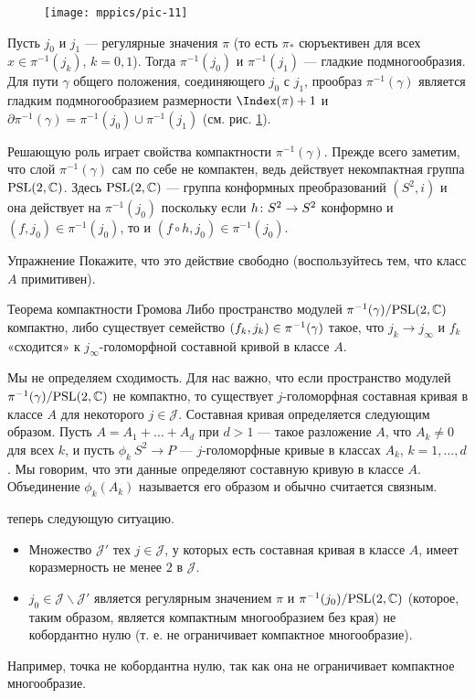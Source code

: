 \begin{figure}[ht!]
\vskip0mm
\centering
\texttt{[image: mppics/pic-11]}
\caption{}\label{pic-11}
\vskip0mm
\end{figure}

Пусть $j_0$ и $j_1$ --- регулярные значения $\pi$ (то есть $\pi_\ast$ сюръективен для всех $x \in \pi^{-1} (j_k)$, $k = 0, 1$).
Тогда $\pi^{-1} (j_0)$ и $\pi^{-1} (j_1)$ --- гладкие подмногообразия.
Для пути $\gamma$ общего положения, соединяющего $j_0$ с $j_1$, прообраз $\pi^{-1}(\gamma)$ является гладким подмногообразием размерности $\Index (\pi) + 1$ и $\partial\pi^{-1} (\gamma) = \pi^{-1} (j_0) \cup \pi^{-1} (j_1)$ (см. рис. \ref{pic-11}).

Решающую роль играет свойства компактности $\pi^{-1} (\gamma)$.
Прежде всего заметим, что слой $\pi^{-1} (\gamma)$ сам по себе не компактен, ведь действует некомпактная группа $\mathrm{PSL}(2, \mathbb{C})$.
Здесь $\mathrm{PSL}(2, \mathbb{C})$ --- группа конформных преобразований $(S^2, i)$ и она действует на $\pi^{-1} (j_0)$ поскольку
если $h\: S^2 \z\to S^2$ конформно и $(f, j_0) \in \pi^{-1} (j_0)$, то и $(f \circ h, j_0) \in \pi^{-1} (j_0)$.

\begin{ex*}{Упражнение}
Покажите, что это действие свободно (воспользуйтесь тем, что класс $A$ примитивен).
\end{ex*}

\begin{thm*}{Теорема компактности Громова}
Либо пространство модулей $\pi^{-1} (\gamma)/\mathrm{PSL}(2, \mathbb{C})$ компактно, либо существует семейство $(f_k, j_k) \z\in \pi^{-1} (\gamma)$ такое, что $j_k \to j_\infty$ и $f_k$ «сходится» к $j_\infty$-голоморфной составной кривой в классе $A$.
\end{thm*}

Мы не определяем сходимость.
Для нас важно, что если пространство модулей $\pi^{-1} (\gamma)/\mathrm{PSL}(2, \mathbb{C})$ не компактно, то существует $j$-голоморфная составная кривая в классе $A$ для некоторого $j \in \mathcal{J}$.
Составная кривая определяется следующим образом.
Пусть $A = A_1 +\dots+ A_d$ при $d > 1$ --- такое разложение $A$, что $A_k \ne 0$ для всех $k$, и пусть $\phi_k \: S^2 \to P$ --- $j$-голоморфные кривые в классах $A_k$, $k = 1,\dots,d$.
Мы говорим, что эти данные определяют составную кривую в классе $A$.
Объединение $\phi_k (A_k)$ называется его образом и обычно считается связным.

 теперь следующую ситуацию.
\begin{itemize}
\item Множество $\mathcal{J}'$ тех $j \in \mathcal{J}$, у которых есть составная кривая в классе $A$, имеет коразмерность не менее $2$ в $\mathcal{J}$.

\item $j_0 \in \mathcal{J}\backslash \mathcal{J}'$ является регулярным значением $\pi$ и $\pi^{-1} (j_0)/\mathrm{PSL}(2, \mathbb{C})$ (которое, таким образом, является компактным многообразием без края) не кобордантно нулю (т. е. не ограничивает компактное многообразие).
 
\end{itemize}
Например, точка не кобордантна нулю, так как она не ограничивает компактное многообразие.


